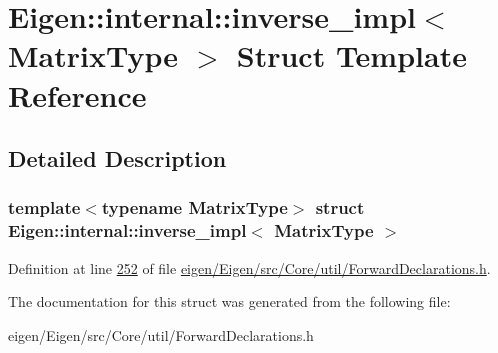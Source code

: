 \hypertarget{struct_eigen_1_1internal_1_1inverse__impl}{}\section{Eigen\+:\+:internal\+:\+:inverse\+\_\+impl$<$ Matrix\+Type $>$ Struct Template Reference}
\label{struct_eigen_1_1internal_1_1inverse__impl}


\subsection{Detailed Description}
\subsubsection*{template$<$typename Matrix\+Type$>$\newline
struct Eigen\+::internal\+::inverse\+\_\+impl$<$ Matrix\+Type $>$}



Definition at line \hyperlink{eigen_2_eigen_2src_2_core_2util_2_forward_declarations_8h_source_l00252}{252} of file \hyperlink{eigen_2_eigen_2src_2_core_2util_2_forward_declarations_8h_source}{eigen/\+Eigen/src/\+Core/util/\+Forward\+Declarations.\+h}.



The documentation for this struct was generated from the following file\+:\begin{DoxyCompactItemize}
\item 
eigen/\+Eigen/src/\+Core/util/\+Forward\+Declarations.\+h\end{DoxyCompactItemize}
